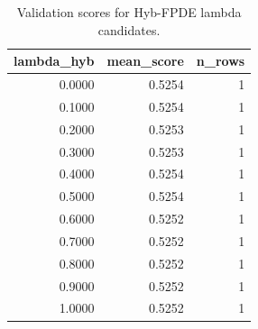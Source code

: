 \begin{table}[t]
\caption{Validation scores for Hyb-FPDE lambda candidates.}
\label{tab:lambda_distribution_computed}
\centering
\begin{tabular}{rrr}
\toprule
lambda\_hyb & mean\_score & n\_rows \\
\midrule
0.0000 & 0.5254 & 1 \\
0.1000 & 0.5254 & 1 \\
0.2000 & 0.5253 & 1 \\
0.3000 & 0.5253 & 1 \\
0.4000 & 0.5254 & 1 \\
0.5000 & 0.5254 & 1 \\
0.6000 & 0.5252 & 1 \\
0.7000 & 0.5252 & 1 \\
0.8000 & 0.5252 & 1 \\
0.9000 & 0.5252 & 1 \\
1.0000 & 0.5252 & 1 \\
\bottomrule
\end{tabular}

\end{table}
